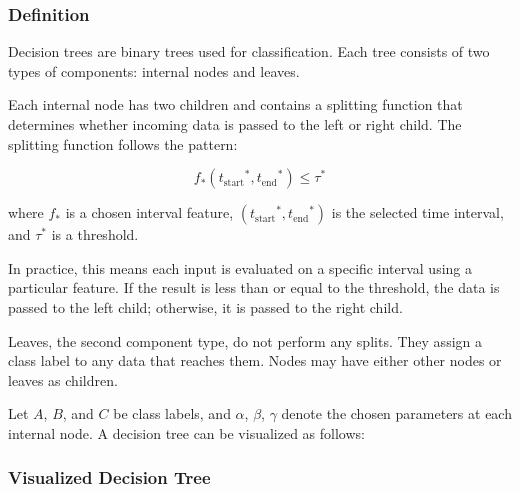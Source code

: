 \subsubsection*{Definition}

Decision trees are binary trees used for 
classification. Each tree consists of two 
types of components: internal nodes and leaves.

Each internal node has two children and contains
 a splitting function that determines whether 
 incoming data is passed to the left or right 
 child. The splitting function follows the 
 pattern:

\[
f_*({t_{\mathrm{start}}}^* , {t_{\mathrm{end}}}^*) \leq \tau^*
\]

where \( f_* \) is a chosen interval feature, 
\( ({t_{\mathrm{start}}}^*, {t_{\mathrm{end}}}^*) \) 
is the selected time interval, and \( \tau^* \) 
is a threshold.

In practice, this means each input is evaluated
on a specific interval using a particular 
feature. If the result is less than or equal
 to the threshold, the data is passed to the 
 left child; otherwise, it is passed to the 
 right child.

Leaves, the second component type, 
do not perform any splits. They assign a 
class label to any data that reaches them. 
Nodes may have either other nodes or leaves 
as children.


Let \(A\), \(B\), and \(C\) be class labels, and \(\alpha\), \(\beta\), \(\gamma\) denote the chosen parameters at each internal node. A decision tree can be visualized as follows:
\subsubsection*{Visualized Decision Tree}

